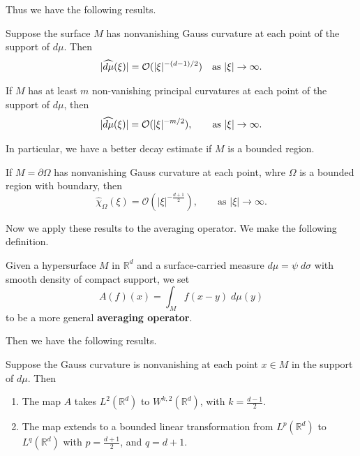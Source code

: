 \documentclass{article}
\begin{document}
Thus we have the following results. 
\begin{theorem}
	Suppose the surface $M$ has nonvanishing Gauss curvature at each point of the support of $d\mu$. Then 
	\begin{equation*}
		|\widehat{d\mu}(\xi)| = \mathcal{O}(|\xi|^{-(d - 1)/2}) \quad \text{as $|\xi| \to \infty$}. 
	\end{equation*}
\end{theorem} 
\begin{corollary}
	If $M$ has at least $m$ non-vanishing principal curvatures at each point of the support of $d\mu$, then 
	\begin{equation*}
		|\widehat{d\mu}(\xi)| = \mathcal{O}(|\xi|^{-m/2}), \qquad \text{as $|\xi| \to \infty$}. 
	\end{equation*}
\end{corollary} 
In particular, we have a better decay estimate if $M$ is a bounded region. 
\begin{theorem}
	If $M = \partial \Omega$ has nonvanishing Gauss curvature at each point, whre $\Omega$ is a bounded region with boundary, then 
	\begin{equation*}
		\hat{\chi}_{\Omega}(\xi) = \mathcal{O}(|\xi|^{-\frac{d + 1}{2}}), \qquad \text{as $|\xi| \to \infty$}. 
	\end{equation*} 
\end{theorem} 
Now we apply these results to the averaging operator. We make the following definition. 
\begin{definition}
	Given a hypersurface $M$ in $\mathbb{R}^{d}$ and a surface-carried measure $d\mu = \psi\;d\sigma$ with smooth density of compact support, we set 
	\begin{equation*}
		A(f)(x) = \int_{M}f(x-y)\;d\mu(y)
	\end{equation*}
	to be a more general \textbf{averaging operator}. 
\end{definition} 
Then we have the following results. 
\begin{theorem}
	Suppose the Gauss curvature is nonvanishing at each point $x \in M$ in the support of $d\mu$. Then \vspace{-0.25cm} 
	\begin{enumerate}[itemsep =-2pt,label = (\alph{*})]
		\item The map $A$ takes $L^{2}(\mathbb{R}^{d})$ to $W^{k,2}(\mathbb{R}^{d})$, with $k = \frac{d - 1}{2}$. 
		\item The map extends to a bounded linear transformation from $L^{p}(\mathbb{R}^{d})$ to $L^{q}(\mathbb{R}^{d})$ with $p = \frac{d + 1}{2}$, and $q = d + 1$. 
	\end{enumerate}
\end{theorem} 
\end{document}
